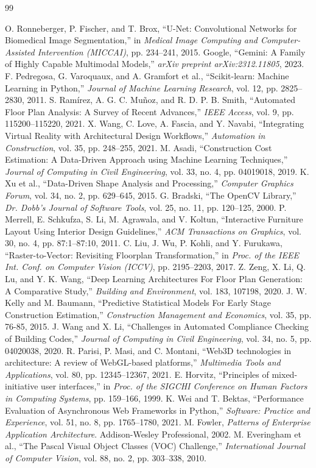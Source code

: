 \documentclass[10pt, conference, a4paper]{IEEEtran}
\begin{document}
\begin{thebibliography}{99}

 O. Ronneberger, P. Fischer, and T. Brox, ``U-Net: Convolutional Networks for Biomedical Image Segmentation,'' in \textit{Medical Image Computing and Computer-Assisted Intervention (MICCAI)}, pp. 234–241, 2015.
 Google, ``Gemini: A Family of Highly Capable Multimodal Models,'' \textit{arXiv preprint arXiv:2312.11805}, 2023.
 F. Pedregosa, G. Varoquaux, and A. Gramfort et al., ``Scikit-learn: Machine Learning in Python,'' \textit{Journal of Machine Learning Research}, vol. 12, pp. 2825–2830, 2011.
 S. Ramírez, A. G. C. Muñoz, and R. D. P. B. Smith, ``Automated Floor Plan Analysis: A Survey of Recent Advances,'' \textit{IEEE Access}, vol. 9, pp. 115200–115220, 2021.
 X. Wang, C. Love, A. Fascia, and Y. Navabi, ``Integrating Virtual Reality with Architectural Design Workflows,'' \textit{Automation in Construction}, vol. 35, pp. 248–255, 2021.
 M. Asadi, ``Construction Cost Estimation: A Data-Driven Approach using Machine Learning Techniques,'' \textit{Journal of Computing in Civil Engineering}, vol. 33, no. 4, pp. 04019018, 2019.
 K. Xu et al., ``Data-Driven Shape Analysis and Processing,'' \textit{Computer Graphics Forum}, vol. 34, no. 2, pp. 629–645, 2015.
 G. Bradski, ``The OpenCV Library,'' \textit{Dr. Dobb's Journal of Software Tools}, vol. 25, no. 11, pp. 120–125, 2000.
 P. Merrell, E. Schkufza, S. Li, M. Agrawala, and V. Koltun, ``Interactive Furniture Layout Using Interior Design Guidelines,'' \textit{ACM Transactions on Graphics}, vol. 30, no. 4, pp. 87:1–87:10, 2011.
 C. Liu, J. Wu, P. Kohli, and Y. Furukawa, ``Raster-to-Vector: Revisiting Floorplan Transformation,'' in \textit{Proc. of the IEEE Int. Conf. on Computer Vision (ICCV)}, pp. 2195–2203, 2017.
 Z. Zeng, X. Li, Q. Lu, and Y. K. Wang, ``Deep Learning Architectures For Floor Plan Generation: A Comparative Study,'' \textit{Building and Environment}, vol. 183, 107198, 2020.
 J. W. Kelly and M. Baumann, ``Predictive Statistical Models For Early Stage Construction Estimation,'' \textit{Construction Management and Economics}, vol. 35, pp. 76-85, 2015.
 J. Wang and X. Li, ``Challenges in Automated Compliance Checking of Building Codes,'' \textit{Journal of Computing in Civil Engineering}, vol. 34, no. 5, pp. 04020038, 2020.
 R. Parisi, P. Masi, and C. Montani, ``Web3D technologies in architecture: A review of WebGL-based platforms,'' \textit{Multimedia Tools and Applications}, vol. 80, pp. 12345--12367, 2021.
 E. Horvitz, ``Principles of mixed-initiative user interfaces,'' in \textit{Proc. of the SIGCHI Conference on Human Factors in Computing Systems}, pp. 159--166, 1999.
 K. Wei and T. Bektas, ``Performance Evaluation of Asynchronous Web Frameworks in Python,'' \textit{Software: Practice and Experience}, vol. 51, no. 8, pp. 1765--1780, 2021.
 M. Fowler, \textit{Patterns of Enterprise Application Architecture}. Addison-Wesley Professional, 2002.
 M. Everingham et al., ``The Pascal Visual Object Classes (VOC) Challenge,'' \textit{International Journal of Computer Vision}, vol. 88, no. 2, pp. 303--338, 2010.
\end{thebibliography}
\end{document}
